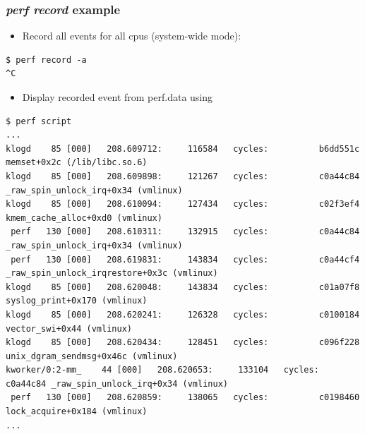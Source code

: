 \begin{frame}[fragile]
  \frametitle{{\em perf record} example}

  \begin{itemize}
    \item Record all events for all cpus (system-wide mode):
  \end{itemize}
  \begin{block}{}
    \begin{verbatim}
$ perf record -a
^C
    \end{verbatim}
  \end{block}
  \begin{itemize}
    \item Display recorded event from perf.data using 
  \end{itemize}
  \begin{block}{}
    \begin{verbatim}
$ perf script
...
klogd    85 [000]   208.609712:     116584   cycles:          b6dd551c memset+0x2c (/lib/libc.so.6)
klogd    85 [000]   208.609898:     121267   cycles:          c0a44c84 _raw_spin_unlock_irq+0x34 (vmlinux)
klogd    85 [000]   208.610094:     127434   cycles:          c02f3ef4 kmem_cache_alloc+0xd0 (vmlinux)
 perf   130 [000]   208.610311:     132915   cycles:          c0a44c84 _raw_spin_unlock_irq+0x34 (vmlinux)
 perf   130 [000]   208.619831:     143834   cycles:          c0a44cf4 _raw_spin_unlock_irqrestore+0x3c (vmlinux)
klogd    85 [000]   208.620048:     143834   cycles:          c01a07f8 syslog_print+0x170 (vmlinux)
klogd    85 [000]   208.620241:     126328   cycles:          c0100184 vector_swi+0x44 (vmlinux)
klogd    85 [000]   208.620434:     128451   cycles:          c096f228 unix_dgram_sendmsg+0x46c (vmlinux)
kworker/0:2-mm_    44 [000]   208.620653:     133104   cycles:          c0a44c84 _raw_spin_unlock_irq+0x34 (vmlinux)
 perf   130 [000]   208.620859:     138065   cycles:          c0198460 lock_acquire+0x184 (vmlinux)
...
    \end{verbatim}
  \end{block}
\end{frame}

